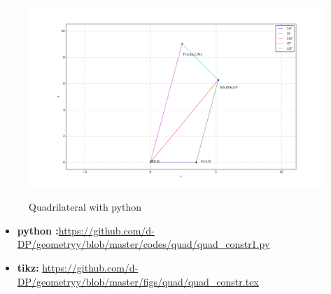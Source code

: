 \begin{frame}
\begin{figure}[!h]
\resizebox{0.9\linewidth}{!}
{
\includegraphics[scale=0.4]{./figs/quad/quad_constr1.png}
}
\caption{Quadrilateral with python}
\label{fig:foo}
\end{figure}
\begin{itemize}
\item \textbf{python :}\url{https://github.com/d-DP/geometryy/blob/master/codes/quad/quad_constr1.py}\\
\item \textbf{tikz:} \url{https://github.com/d-DP/geometryy/blob/master/figs/quad/quad_constr.tex}
\end{itemize}
\end{frame}

